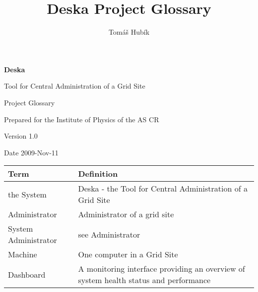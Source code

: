 \documentclass[12pt]{article}
\author{Tomáš Hubík}
\title{Deska Project Glossary}
\begin{document}
{\Huge \textbf{Deska}}

\vspace{0.2in}

{\large Tool for Central Administration of a Grid Site}

\vspace{0.5in}

{\large Project Glossary}

\vspace{0.2in}

{\large Prepared for the Institute of Physics of the AS CR}

\vspace{0.2in}

{\large Version 1.0}

\vspace{0.2in}

{\large Date 2009-Nov-11}

\vspace{0.5in}


\begin{center}
	\begin{tabular}{| p{3.5cm} | p{11.5cm} |}
		\hline
		\textbf{Term} & \textbf{Definition}\\
		\hline
	the System	& Deska - the Tool for Central Administration of a Grid Site \\
	\hline
	Administrator & Administrator of a grid site\\
	\hline
	System Administrator & see Administrator\\
	\hline
	Machine		& One computer in a Grid Site\\
	\hline
	Dashboard	& A monitoring interface providing an overview of system health status and performance\\
		\hline
	\end{tabular}
	\label{tab:ProjectGlossary}
\end{center}
\end{document}

